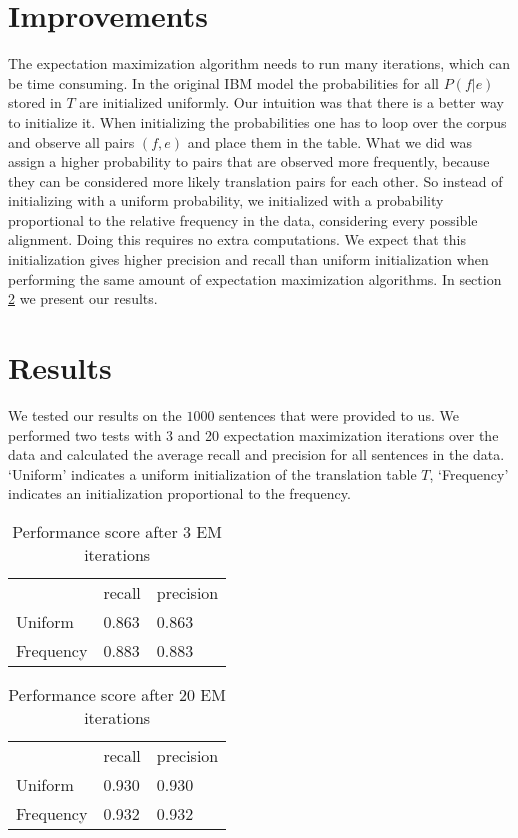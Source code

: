 \documentclass[11pt]{article}
\begin{document}
\section{Improvements}
\label{own}
The expectation maximization algorithm needs to run many iterations, which can be time consuming. In the original IBM model the probabilities for all $P(f|e)$ stored in $T$ are initialized uniformly. Our intuition was that there is a better way to initialize it. When initializing the probabilities one has to loop over the corpus and observe all pairs $(f,e)$ and place them in the table. What we did was assign a higher probability to pairs that are observed more frequently, because they can be considered more likely translation pairs for each other. So instead of initializing with a uniform probability, we initialized with a probability proportional to the relative frequency in the data, considering every possible alignment. Doing this requires no extra computations. We expect that this initialization gives higher precision and recall than uniform initialization when performing the same amount of expectation maximization algorithms. In section \ref{results} we present our results.

\section{Results}
\label{results}
We tested our results on the $1000$ sentences that were provided to us. We performed two tests with 3 and 20 expectation maximization iterations over the data and calculated the average recall and precision for all sentences in the data. `Uniform' indicates a uniform initialization of the translation table $T$, `Frequency' indicates an initialization proportional to the frequency.

\begin{table}[H]
    \begin{tabular}{lll}
    ~ & recall  & precision \\
    Uniform & 0.863 & 0.863 \\
    Frequency & 0.883 & 0.883 \\
    \end{tabular}
    \caption{Performance score after 3 EM iterations}
\end{table}

\begin{table}[H]
    \begin{tabular}{lll}
    ~ & recall  & precision \\
    Uniform & 0.930 & 0.930 \\
    Frequency & 0.932 & 0.932 \\
    \end{tabular}
    \caption{Performance score after 20 EM iterations}
\end{table}
\end{document}

